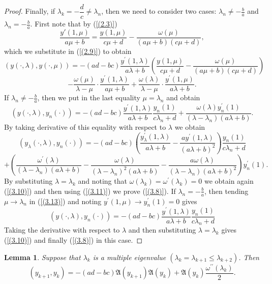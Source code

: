 \documentclass[10pt,a4paper]{amsart}
\newtheorem{lem}[thm]{Lemma}
\numberwithin{equation}{section}
\begin{document}
\begin{proof}
Finally, if $\lambda_k = -\dfrac{d}{c}\neq\lambda_n$, then we need to consider two cases: $\lambda_n\neq-\frac{b}{a}$ and $\lambda_n=-\frac{b}{a}$.
First note that by (\ref{(2.3)}) 
\begin{equation*}
    \frac{y{'}(1,\mu)}{a\mu + b}=\frac{y(1,\mu)}{c\mu + d}-\frac{\omega(\mu)}{(a\mu + b)(c\mu + d)},
\end{equation*}
which we substitute in (\ref{(2.9)}) to obtain 
\[
\left(y(\cdot,\lambda), y(\cdot,\mu)\right)
= -(ad - bc)\frac{y^\prime(1,\lambda)}{a\lambda + b}\left(\frac{y(1,\mu)}{c\mu + d}-\frac{\omega(\mu)}{(a\mu + b)(c\mu + d)} \right)
\]
\begin{equation}
- \frac{\omega({\mu})}{\lambda - {\mu}} \cdot \frac{y^\prime(1,\lambda)}{a{\mu} + b}
+ \frac{\omega(\lambda)}{\lambda - {\mu}} \cdot \frac{{y^\prime(1,\mu)}}{a\lambda + b}.\label{(3.13)}
\end{equation}
If  $\lambda_n\neq-\frac{b}{a}$, then we put in the last equality $\mu=\lambda_n$ and obtain 
\[
\left(y(\cdot,\lambda), y_n(\cdot)\right)
= -(ad - bc)\frac{y^\prime(1,\lambda)}{a\lambda + b}\frac{y_n(1)}{c\lambda_n + d}+\frac{\omega(\lambda)y^\prime_n(1)}{(\lambda-\lambda_n)(a\lambda + b)}.
\]
By taking derivative of this equality with respect to $\lambda$ we obtain 
\[
\left(y_\lambda(\cdot,\lambda), y_n(\cdot)\right)
= -(ad - bc)\left(\frac{y_\lambda^\prime(1,\lambda)}{a\lambda + b}-\frac{ay^\prime(1,\lambda)}{(a\lambda + b)^2}\right)\frac{y_n(1)}{c\lambda_n + d}
\]
\begin{equation*}
    +\left(\frac{\omega^\prime(\lambda)}{(\lambda-\lambda_n)(a\lambda + b)}-\frac{\omega(\lambda)}{(\lambda-\lambda_n)^2(a\lambda + b)}-\frac{a\omega(\lambda)}{(\lambda-\lambda_n)(a\lambda + b)^2}\right)y_n^\prime(1).
\end{equation*}
By substituting $\lambda=\lambda_k$ and noting that $\omega(\lambda_k)=\omega^\prime(\lambda_k)=0 $  we obtain again (\ref{(3.10)}) and then using (\ref{(3.11)}) we prove (\ref{(3.8)}).
If  $\lambda_n=-\frac{b}{a}$, then tending $\mu\to\lambda_n$ in (\ref{(3.13)}) and noting $y^\prime(1,\mu)\to y_n^\prime(1)=0$ gives 
\begin{equation}
   \left(y(\cdot,\lambda), y_n(\cdot)\right)
= -(ad - bc)\frac{y^\prime(1,\lambda)}{a\lambda + b}\frac{y_n(1)}{c\lambda_n + d} \label{(3.14)}
\end{equation}
Taking the derivative with respect to $\lambda$ and then substituting $\lambda=\lambda_k$ gives (\ref{(3.10)}) and finally (\ref{(3.8)}) in this case.
\end{proof}
\begin{lem} Suppose that  $\lambda _{k}$ is a multiple eigenvalue \((\lambda_{k}=\lambda_{k+1} \le\lambda_{k+2})\).
Then 
\begin{equation}
\left( y_{k + 1},y_{k} \right) = - (ad - bc)\mathfrak{A}(y_{k+1})\mathfrak{A}(y_{k})+\mathfrak{A}(y_k)\frac{\omega^{\prime\prime}(\lambda_k)}{2}. \label{(3.16)}
\end{equation}
\end{lem}
\end{document}
